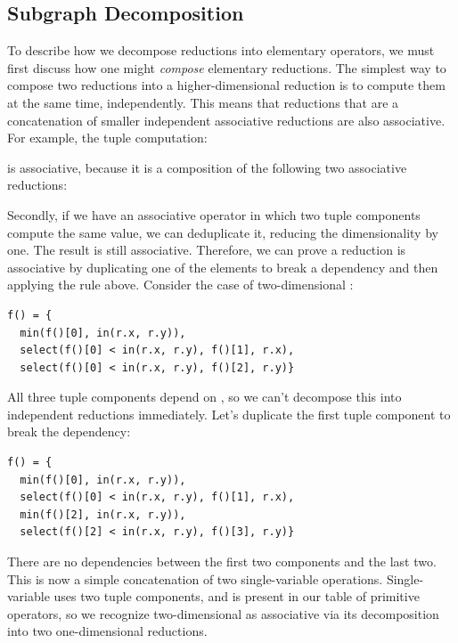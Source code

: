 \subsection{Subgraph Decomposition}
\label{subsec:decomposition}

To describe how we decompose reductions into elementary operators, we must first discuss how one might \emph{compose} elementary reductions. The simplest way to compose two reductions into a higher-dimensional reduction is to compute them at the same time, independently. This means that reductions that are a concatenation of smaller independent associative reductions are also associative. For example, the tuple computation:


is associative, because it is a composition of the following two associative reductions:



Secondly, if we have an associative operator in which two tuple components compute the same value, we can deduplicate it, reducing the dimensionality by one. The result is still associative. Therefore, we can prove a reduction is associative by duplicating one of the elements to break a dependency and then applying the rule above. Consider the case of two-dimensional :

\begin{lstlisting}[caption={Two-dimensional argmin. The three tuple components are the minimum value, and its $x$ and $y$ coordinates.}]
f() = {
  min(f()[0], in(r.x, r.y)),
  select(f()[0] < in(r.x, r.y), f()[1], r.x),
  select(f()[0] < in(r.x, r.y), f()[2], r.y)}
\end{lstlisting}

All three tuple components depend on , so we can't decompose this into independent reductions immediately. Let's duplicate the first tuple component to break the dependency:

\begin{lstlisting}[caption={Two-dimensional argmin with the minimum value redundantly computed as \code{f()[0]} and \code{f()[2]}}]
f() = {
  min(f()[0], in(r.x, r.y)),
  select(f()[0] < in(r.x, r.y), f()[1], r.x),
  min(f()[2], in(r.x, r.y)),
  select(f()[2] < in(r.x, r.y), f()[3], r.y)}
\end{lstlisting}

There are no dependencies between the first two components and the last two. This is now a simple concatenation of two single-variable  operations. Single-variable  uses two tuple components, and is present in our table of primitive operators, so we recognize two-dimensional  as associative via its decomposition into two one-dimensional  reductions.

